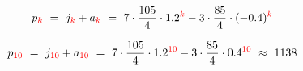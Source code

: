 \begin{frame}
	\[		
	p_{\color{red}k}  
	\ = \
	j_{\color{red}k} + a_{\color{red}k}
	\ = \	
	7\cdot \frac{105}{4}\cdot 1.2^{\color{red}k}	
	-
	3\cdot \frac{85}{4}\cdot (-0.4)^{\color{red}k}	
	\]
	
	\vspace{1mm}
	\[		
	p_{\color{red}10}  
	\ = \
	j_{\color{red}10} + a_{\color{red}10}
	\ = \	
	7\cdot \frac{105}{4}\cdot 1.2^{\color{red}10}	
	-
	3\cdot \frac{85}{4}\cdot 0.4^{\color{red}10}
	\ \approx \
	1138
	\]
\end{frame}


\subsection{}

